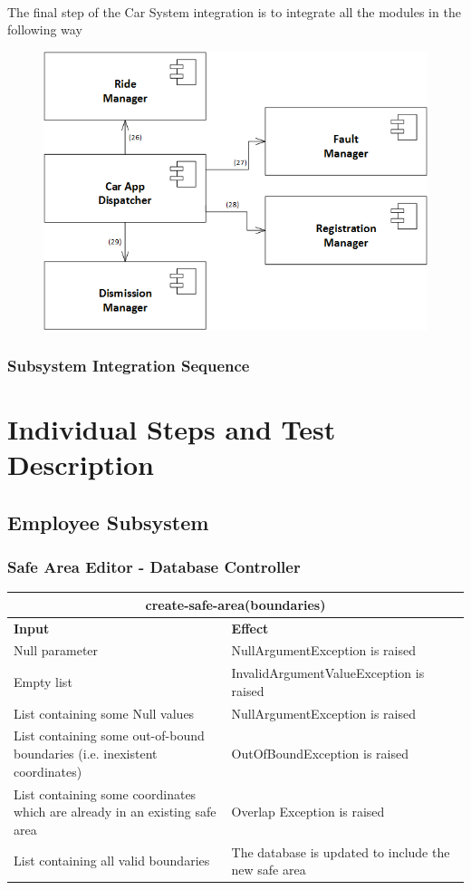 \documentclass{article}
\begin{document}
\\
The final step of the Car System integration is to integrate all the modules in the following way
\begin{figure}[H]
\includegraphics[scale=0.5]{Dispatcher/Dispatcher} 
\centering
\end{figure}



\subsubsection{Subsystem Integration Sequence}

\newpage
\section{Individual Steps and Test Description}
\subsection{Employee Subsystem}
\subsubsection{Safe Area Editor - Database Controller}
\begin{tabular}{ |p{5cm}|p{7cm}| }
  \hline
  \multicolumn{2}{|c|}{create-safe-area(boundaries)} \\
  \hline
  \textbf{Input} & \textbf{Effect} \\
  \hline
  Null parameter & NullArgumentException is raised\\
  \hline
  Empty list & InvalidArgumentValueException is raised\\
  \hline
  List containing some Null values & NullArgumentException is raised\\
  \hline
  List containing some out-of-bound boundaries (i.e. inexistent coordinates) & OutOfBoundException is raised\\
  \hline
  List containing some coordinates which are already in an existing safe area & Overlap Exception is raised\\
  \hline
  List containing all valid boundaries & The database is updated to include the new safe area\\
  \hline
\end{tabular}
\end{document}
